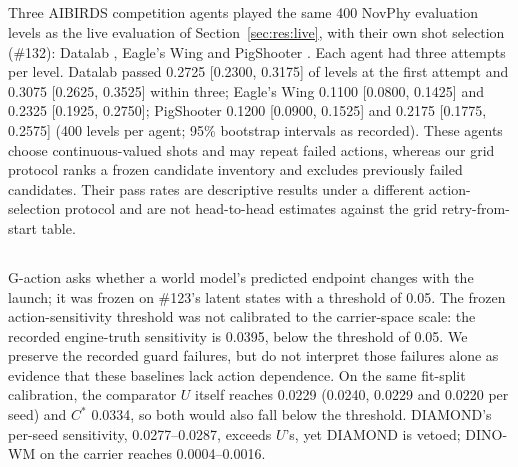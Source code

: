 \subsection{\texorpdfstring{}{Heuristic agents under a native-action protocol}}
\label{sec:app:ext:agents}

\begin{revblock}
\nopagebreak
Three AIBIRDS competition agents \citep{renz2015aibirds} played the same 400 NovPhy evaluation levels as the live evaluation of Section~\ref{sec:res:live}, with their own shot selection (\#132): Datalab \citep{spetlik2014datalab}, Eagle's Wing \citep{wang2017eaglewing} and PigShooter \citep{pinto2024novphy,xue2023phyq}. Each agent had three attempts per level. Datalab passed 0.2725 [0.2300, 0.3175] of levels at the first attempt and 0.3075 [0.2625, 0.3525] within three; Eagle's Wing 0.1100 [0.0800, 0.1425] and 0.2325 [0.1925, 0.2750]; PigShooter 0.1200 [0.0900, 0.1525] and 0.2175 [0.1775, 0.2575] (400 levels per agent; 95\% bootstrap intervals as recorded). These agents choose continuous-valued shots and may repeat failed actions, whereas our grid protocol ranks a frozen candidate inventory and excludes previously failed candidates. Their pass rates are descriptive results under a different action-selection protocol and are not head-to-head estimates against the grid retry-from-start table.
\end{revblock}

\subsection{\texorpdfstring{}{Calibration of the action-sensitivity guard}}
\label{sec:app:ext:guard}

\begin{revblock}
\nopagebreak
G-action asks whether a world model's predicted endpoint changes with the launch; it was frozen on \#123's latent states with a threshold of 0.05. The frozen action-sensitivity threshold was not calibrated to the carrier-space scale: the recorded engine-truth sensitivity is 0.0395, below the threshold of 0.05. We preserve the recorded guard failures, but do not interpret those failures alone as evidence that these baselines lack action dependence. On the same fit-split calibration, the comparator $U$ itself reaches 0.0229 (0.0240, 0.0229 and 0.0220 per seed) and $C^{*}$ 0.0334, so both would also fall below the threshold. DIAMOND's per-seed sensitivity, 0.0277--0.0287, exceeds $U$'s, yet DIAMOND is vetoed; DINO-WM on the carrier reaches 0.0004--0.0016.
\end{revblock}

